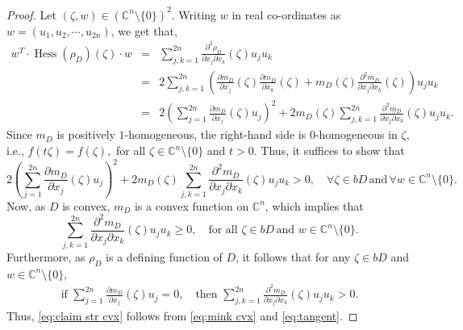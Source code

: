 \documentclass[10pt,a4paper]{amsart}
\newcommand{\C}{\mathbb C}
\newcommand{\be} {\begin{equation}}
\newcommand{\bea} {\begin{eqnarray}}
\newcommand{\beas}{\begin{eqnarray*}}
\newcommand{\ee} {\end{equation}}
\newcommand{\eea} {\end{eqnarray}}
\newcommand{\eeas}{\end{eqnarray*}}
\newcommand{\ltt}{\left(}
\newcommand{\rtt}{\right)}
\begin{document}
\begin{proof}
Let $\ltt \zeta,w\rtt\in \ltt\C^n\setminus\{0\}\rtt^2$. Writing $w$ in real co-ordinates as $w=\ltt u_1,u_2,\cdots,u_{2n}\rtt$, we get that,
\beas
w^T \cdot \operatorname{Hess}(\rho_D)(\zeta)\cdot w &=& 
\sum_{j,k=1}^{2n} \frac{\partial^2\rho_D}{\partial x_j \partial x_k}(\zeta) u_ju_k\\
&=&2\sum_{j,k=1}^{2n} \ltt\frac{\partial m_D}{\partial x_j}(\zeta)\frac{\partial m_D}{\partial x_k}(\zeta)+m_D(\zeta) \frac{\partial^2 m_D}{\partial x_j \partial x_k}(\zeta)\rtt  u_ju_k \\
&=&2\ltt \sum_{j=1}^{2n}\frac{\partial m_D}{\partial x_j}(\zeta) u_j\rtt^2+2m_D(\zeta) \sum_{j,k=1}^{2n}\frac{\partial^2 m_D}{\partial x_j \partial x_k}(\zeta) u_ju_k.
\eeas
Since $m_D$ is positively $1$-homogeneous, the right-hand side is $0$-homogeneous in $\zeta$,  i.e., $f(t\zeta)=f(\zeta),$ for all $\zeta\in\C^n\setminus\{0\}$ and $t>0$. 
Thus, it suffices to show that
\be\label{eq:claim str cvx}
2\ltt \sum_{j=1}^{2n}\frac{\partial m_D}{\partial x_j}(\zeta) u_j\rtt^2+2m_D(\zeta) \sum_{j,k=1}^{2n}\frac{\partial^2 m_D}{\partial x_j \partial x_k}(\zeta) u_ju_k>0,\quad\forall \zeta\in bD\,\text{and}\,\forall w\in\C^n\setminus\{0\}.
\ee
Now, as $D$ is convex, $m_D$ is a convex function on $\C^n$, which implies that 
\be\label{eq:mink cvx}
\sum_{j,k=1}^{2n}\frac{\partial^2 m_D}{\partial x_j \partial x_k}(\zeta) u_ju_k\geq 0,\quad\text{for all } \zeta\in bD\,\text{and } w\in\C^n\setminus\{0\}.
\ee
Furthermore, as $\rho_D$ is a defining function of $D$, it follows that for any $\zeta\in bD$ and $w\in \C^n\setminus\{0\}$, 
\bea\label{eq:tangent}
\text{if }
\sum_{j=1}^{2n}\frac{\partial m_D}{\partial x_j}(\zeta) u_j=0,
\quad \text{then }
\sum_{j,k=1}^{2n}\frac{\partial^2 m_D}{\partial x_j \partial x_k}(\zeta)u_ju_k>0.
\eea
Thus, \eqref{eq:claim str cvx} follows  from \eqref{eq:mink cvx} and \eqref{eq:tangent}.
\end{proof}
\end{document}
